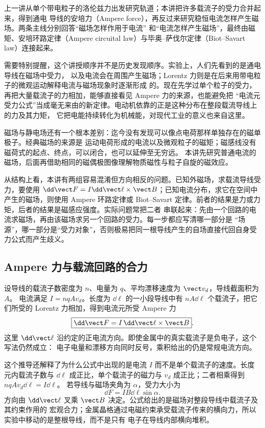 上一讲从单个带电粒子的洛伦兹力出发研究轨道；本讲把许多载流子的受力合并起来，得到通电
导线的安培力（Ampere force），再反过来研究稳恒电流怎样产生磁场。两条主线分别回答“磁场怎样作用于电流”
和“电流怎样产生磁场”，最终由磁矩、安培环路定律（Ampere circuital law）与毕奥--萨伐尔定律（Biot--Savart law）连接起来。

需要特别提醒，这个讲授顺序并不是历史发现顺序。实验上，人们先看到的是通电导线在磁场中受力，
以及电流会在周围产生磁场；Lorentz 力则是在后来用带电粒子的微观运动解释电流与磁场现象时逐渐形成
的。现在先学过单个粒子的受力，再把大量载流子的力相加，能够直接看见 Ampere 力的来源，也能避免把
“电流元受力公式”当成毫无来由的新定律。电动机依靠的正是这种分布在整段载流导线上的力及其力矩，
它把电能持续转化为机械能，对现代工业的意义也来自这里。

磁场与静电场还有一个根本差别：迄今没有发现可以像点电荷那样单独存在的磁单极子。经典磁场的来源是
运动电荷形成的电流以及微观粒子的磁矩；磁感线没有磁荷式的起点、终点，可以闭合，也可以延伸至无穷远。
本讲先研究普通电流的磁场，后面再借助相同的磁偶极图像理解物质磁性与粒子自旋的磁效应。

从结构上看，本讲有两组容易混淆但方向相反的问题。已知外磁场，求载流导线受力，要使用
$\dd\vect F=I\dd\vect\ell\times\vect B$；已知电流分布，求它在空间中产生的磁场，则使用 Ampere
环路定律或 Biot--Savart 定律。前者的结果是力或力矩，后者的结果是磁感应强度。实际问题常把二者
串联起来：先由一个回路的电流求磁场，再由该磁场求另一个回路的受力。每一步都应写清哪一部分是
“场源”，哪一部分是“受力对象”，否则极易把同一根导线产生的自场直接代回自身受力公式而产生歧义。

\subsection{Ampere 力与载流回路的合力}

设导线的载流子数密度为 $n$、电量为 $q$、平均漂移速度为 $\vect v_d$，导线截面积为 $A$。
电流满足 $I=nqAv_d$。长度为 $\dd\ell$ 的一小段导线中有 $nA\dd\ell$ 个载流子，把它们所受的
Lorentz 力相加，得到电流元所受 Ampere 力
\begin{equation}
  \boxed{\dd\vect F=I\,\dd\vect\ell\times\vect B}.
\end{equation}
这里 $\dd\vect\ell$ 沿约定的正电流方向。即使金属中的真实载流子是负电子，这个写法仍然成立：
电子电量和漂移方向同时反号，乘积给出的仍是常规电流方向。

这个推导还解释了为什么公式中出现的是电流 $I$ 而不是单个载流子的速度。长度元内载流子数与
$\dd\ell$ 成正比，单个载流子的磁力与 $v_d$ 成正比；二者相乘得到 $nqAv_d\dd\ell=I\dd\ell$。
若导线与磁场夹角为 $\alpha$，受力大小为
\begin{equation}
  \dd F=IB\dd\ell\sin\alpha.
\end{equation}
方向由 $\dd\vect\ell$ 叉乘 $\vect B$ 决定。公式给出的是磁场对整段导线中载流子及其约束作用的
宏观合力；金属晶格通过电磁约束承受载流子传来的横向力，所以实验中移动的是整根导线，而不是只有
电子在导线内部横向堆积。

